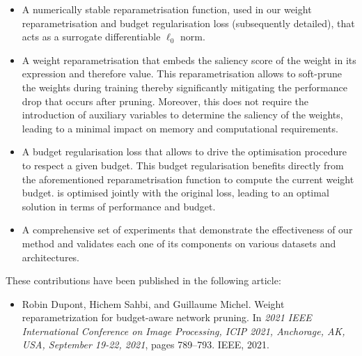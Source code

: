 \begin{itemize}
      \item A numerically stable reparametrisation function, used in \DIFaddbegin {}\DIFaddend our
            weight reparametrisation and \DIFaddbegin {}\DIFaddend budget regularisation loss
            (subsequently detailed), that acts as a surrogate differentiable
            $\ell_0$ norm.

      \item A weight reparametrisation that embeds the saliency score of the
            weight in its expression and therefore value. This reparametrisation
            allows to soft-prune the weights during training thereby significantly
            mitigating the performance drop that occurs after pruning. Moreover,
            this \DIFdelbegin {}\DIFdelend \DIFaddbegin {}\DIFaddend does not require the introduction of auxiliary
            variables to determine the saliency of the weights, leading to a
            minimal impact on memory and computational requirements.

      \item A budget regularisation loss that allows to drive the optimisation
            procedure to respect a given budget. This budget regularisation \DIFaddbegin {}\DIFaddend benefits directly from the aforementioned reparametrisation function
            to compute the current weight budget. \DIFdelbegin {}\DIFdelend \DIFaddbegin {}\DIFaddend is optimised jointly with
            the original loss, leading to an optimal solution in terms of
            performance and budget.

      \item A comprehensive set of experiments that demonstrate the effectiveness
            of our method and validates each one of its components on various
            datasets and architectures.\\
\end{itemize}

\noindent These contributions have been published in the following article:
\begin{itemize}
      \item Robin Dupont, Hichem Sahbi, and Guillaume Michel. Weight
            reparametrization for budget-aware network pruning. In \emph{2021
            IEEE International Conference on Image Processing, ICIP 2021,
            Anchorage, AK, USA, September 19-22, 2021}, pages 789–793. IEEE,
            2021.\\
\end{itemize}



